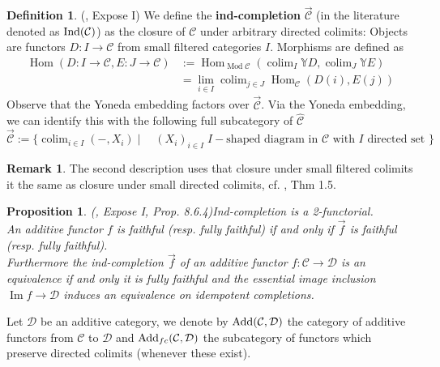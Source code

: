 \documentclass[11pt,a4paper]{amsart}
\theoremstyle{plain}
\newtheorem{pro}[thm]{Proposition}
\theoremstyle{definition}
\newtheorem{dfn}[thm]{Definition}
\newtheorem{rem}[thm]{Remark}
\DeclareMathOperator{\Hom}{Hom}
\DeclareMathOperator{\Modu}{Mod}
\DeclareMathOperator*{\colim}{colim}
\DeclareMathOperator{\Bild}{Im}
\newcommand{\mcC}{\mathcal{C}}
\newcommand{\mcD}{\mathcal{D}}
\begin{document}
\begin{dfn} (\cite{SGA4}, Expose I)
We define the \textbf{ind-completion} $\overrightarrow{\mcC}$ (in the literature denoted as ${\rm Ind}(\mcC)$) as the closure of $\mcC$ under arbitrary directed colimits: 
Objects are functors $D\colon I \to \mcC$ from small filtered categories $I$. Morphisms are defined as 
\[
\begin{aligned}
\Hom(D\colon I \to \mcC, E\colon J \to \mcC) &:= \Hom_{\Modu \mcC} (\colim_I \mathbb{Y}D, \colim_J \mathbb{Y}E)\\ &= \lim_{i\in I} \colim_{j\in J} \Hom_{\mcC} (D(i) , E(j)) 
\end{aligned}
\]
Observe that the Yoneda embedding factors over $\overrightarrow{\mcC}$. 
Via the Yoneda embedding, we can identify this with the following full subcategory of $\hat{\mcC}$
\[
\overrightarrow{\mcC}:= \{\colim_{i\in I}(-,X_i)\mid \quad 
(X_i)_{i \in I}\; I\!-\!\text{shaped diagram in }\mcC \text{ with } I\text{ directed set }\}
\]    
\end{dfn}
\begin{rem}
The second description uses that closure under small filtered colimits it the same as closure under small directed colimits, cf. \cite{ARo}, Thm 1.5.    \end{rem}


\begin{pro} (\cite{SGA4}, Expose I, Prop. 8.6.4)\label{SGA4Ind}
Ind-completion is a 2-functorial. \\
An additive functor $f$ is faithful (resp. fully faithful) if and only if $\overrightarrow{f}$ is faithful (resp. fully faithful). \\
Furthermore the ind-completion $\overrightarrow{f}$ of an additive functor $f\colon \mcC\to \mcD$ is an equivalence if and only it is fully faithful and the essential image inclusion $\Bild f \to \mcD$ induces an equivalence on idempotent completions.  
\end{pro}



 Let $\mcD$ be an additive category, we denote by ${\rm Add}(\mcC, \mcD)$ the category of additive functors from $\mcC$ to $\mcD$ and ${\rm Add}_{fc}(\mcC, \mcD)$ the subcategory of functors which preserve directed colimits (whenever these exist). 
\end{document}
